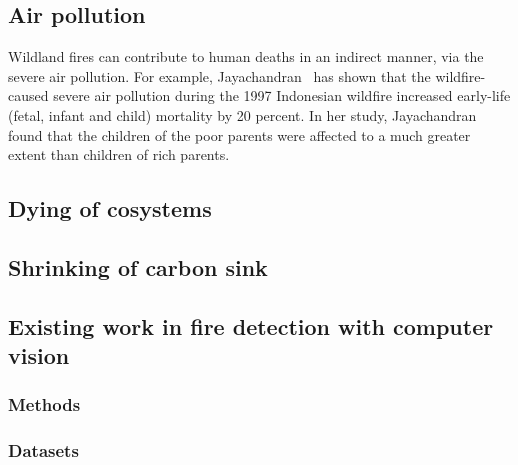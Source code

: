   \subsection{Air pollution} Wildland fires can contribute to human deaths in an indirect manner, via the severe air pollution.
  For example, Jayachandran~\cite{Jayachandran2009} has shown that the wildfire-caused severe air pollution during the 
  1997 Indonesian wildfire increased early-life (fetal, infant and child) mortality by 20 percent.
  In her study, Jayachandran found that the children of the poor parents were affected to a much greater extent than children of rich parents. %



  \subsection{Dying of cosystems}
  
  \subsection{Shrinking of carbon sink}



  


  \subsection{Existing work in fire detection with computer vision}

  \subsubsection{Methods}

  \subsubsection{Datasets}


